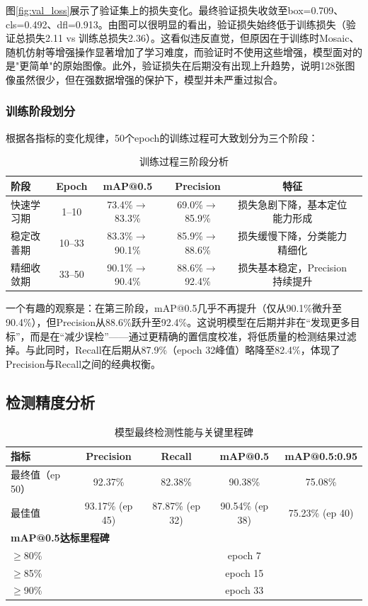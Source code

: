 \documentclass[12pt,a4paper]{article}
\begin{document}
图\ref{fig:val_loss}展示了验证集上的损失变化。最终验证损失收敛至box=0.709、cls=0.492、dfl=0.913。由图可以很明显的看出，验证损失始终低于训练损失（验证总损失2.11 vs 训练总损失2.36）。这看似违反直觉，但原因在于训练时Mosaic、随机仿射等增强操作显著增加了学习难度，而验证时不使用这些增强，模型面对的是"更简单"的原始图像。此外，验证损失在后期没有出现上升趋势，说明128张图像虽然很少，但在强数据增强的保护下，模型并未严重过拟合。

\subsubsection{训练阶段划分}

根据各指标的变化规律，50个epoch的训练过程可大致划分为三个阶段：

\begin{table}[H]
\centering
\caption{训练过程三阶段分析}
\label{tab:phases}
\begin{tabular}{lccccc}
\toprule
\textbf{阶段} & \textbf{Epoch} & \textbf{mAP@0.5} & \textbf{Precision} & \textbf{特征} \\
\midrule
快速学习期 & 1--10 & 73.4\%$\to$83.3\% & 69.0\%$\to$85.9\% & 损失急剧下降，基本定位能力形成 \\
稳定改善期 & 10--33 & 83.3\%$\to$90.1\% & 85.9\%$\to$88.6\% & 损失缓慢下降，分类能力精细化 \\
精细收敛期 & 33--50 & 90.1\%$\to$90.4\% & 88.6\%$\to$92.4\% & 损失基本稳定，Precision持续提升 \\
\bottomrule
\end{tabular}
\end{table}

一个有趣的观察是：在第三阶段，mAP@0.5几乎不再提升（仅从90.1\%微升至90.4\%），但Precision从88.6\%跃升至92.4\%。这说明模型在后期并非在“发现更多目标”，而是在“减少误检”——通过更精确的置信度校准，将低质量的检测结果过滤掉。与此同时，Recall在后期从87.9\%（epoch 32峰值）略降至82.4\%，体现了Precision与Recall之间的经典权衡。

\subsection{检测精度分析}

\begin{table}[H]
\centering
\caption{模型最终检测性能与关键里程碑}
\label{tab:final}
\begin{tabular}{lcccc}
\toprule
\textbf{指标} & \textbf{Precision} & \textbf{Recall} & \textbf{mAP@0.5} & \textbf{mAP@0.5:0.95} \\
\midrule
最终值（ep 50） & 92.37\% & 82.38\% & 90.38\% & 75.08\% \\
最佳值 & 93.17\% (ep 45) & 87.87\% (ep 32) & 90.54\% (ep 38) & 75.23\% (ep 40) \\
\midrule
\multicolumn{5}{l}{\textbf{mAP@0.5达标里程碑}} \\
$\geq$80\% &  &  & epoch 7 &  \\
$\geq$85\% &  &  & epoch 15 &  \\
$\geq$90\% &  &  & epoch 33 &  \\
\bottomrule
\end{tabular}
\end{table}
\end{document}
